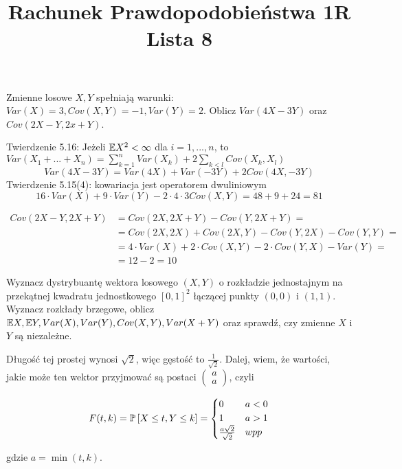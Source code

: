\documentclass{article}
\title{Rachunek Prawdopodobieństwa 1R\\{\normalsize Lista 8}}
\author{}
\date{}
\begin{document}
\maketitle
\thispagestyle{empty}

\begin{problem}{}
Zmienne losowe $X,Y$ spełniają warunki: $Var(X)=3,Cov(X,Y)=-1,Var(Y)=2$. Oblicz $Var(4X-3Y)$ oraz $Cov(2X-Y,2x+Y)$.
\end{problem}

Twierdzenie 5.16: Jeżeli $\mathbb{E} X^2<\infty$ dla $i=1,...,n$, to $Var(X_1+...+X_n)=\sum_{k=1}^nVar(X_k)+2\sum_{k<l}Cov(X_k,X_l)$
$$Var(4X-3Y)=Var(4X)+Var(-3Y)+2Cov(4X,-3Y)$$
Twierdzenie 5.15(4): kowariacja jest operatorem dwuliniowym
$$16\cdot Var(X)+9\cdot Var(Y)-2\cdot 4\cdot3Cov(X,Y)=48+9+24=81$$

\begin{align*}
    Cov(2X-Y,2X+Y)&=Cov(2X,2X+Y)-Cov(Y,2X+Y)=\\
    &=Cov(2X,2X)+Cov(2X,Y)-Cov(Y,2X)-Cov(Y,Y)=\\
    &=4\cdot Var(X)+2\cdot Cov(X,Y)-2\cdot Cov(Y,X)-Var(Y)=\\
    &=12-2=10
\end{align*}

\begin{problem}{}
Wyznacz dystrybuantę wektora losowego $(X,Y)$ o rozkładzie jednostajnym na przekątnej kwadratu jednostkowego $[0,1]^2$ łączącej punkty $(0,0)$ i $(1,1)$. Wyznacz rozkłady brzegowe, oblicz $\mathbb{E} X,\mathbb{E} Y, Var(X), Var(Y), Cov(X, Y), Var(X+Y)$ oraz sprawdź, czy zmienne $X$ i $Y$ są niezależne. 
\end{problem}

{\rightskip=7cm %
Długość tej prostej wynosi $\sqrt{2}$, więc gęstość to $\frac{1}{\sqrt{2}}$. Dalej, wiem, że wartości, jakie może ten wektor przyjmować są postaci $\begin{pmatrix}a\\a\end{pmatrix}$, czyli
\begin{multicols}{2}$$F(t, k)=\prob{X\leq t,Y\leq k}=\begin{cases}0&a<0\\1&a>1\\\frac{a\sqrt{2}}{\sqrt{2}}&wpp\end{cases}$$
\end{multicols}}
gdzie $a=\min(t,k)$.
\end{document}

